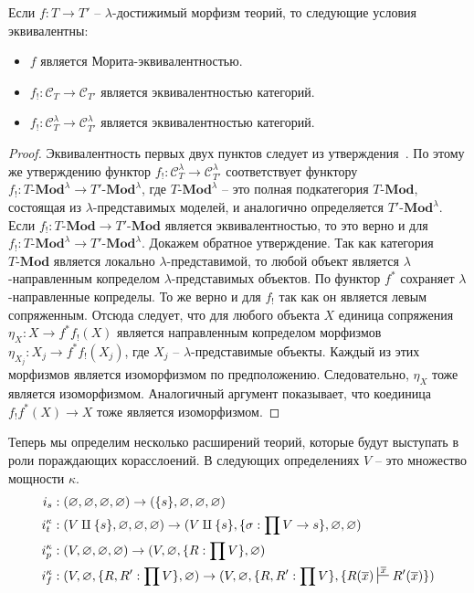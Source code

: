 \documentclass[reqno]{amsart}
\theoremstyle{definition}
\theoremstyle{remark}
\newcommand{\bcat}[1]{\mathbf{#1}}
\newcommand{\cat}[1]{\mathcal{#1}}
\newcommand{\Mod}[1]{#1\text{-}\bcat{Mod}}
\begin{document}
\begin{prop}
Если $f : T \to T'$ -- $\lambda$-достижимый морфизм теорий, то следующие условия эквивалентны:
\begin{itemize}
\item $f$ является Морита-эквивалентностью.
\item $f_! : \cat{C}_T \to \cat{C}_{T'}$ является эквивалентностью категорий.
\item $f_! : \cat{C}_T^\lambda \to \cat{C}_{T'}^\lambda$ является эквивалентностью категорий.
\end{itemize}
\end{prop}
\begin{proof}
Эквивалентность первых двух пунктов следует из утверждения~.
По этому же утверждению функтор $f_! : \cat{C}_T^\lambda \to \cat{C}_{T'}^\lambda$ соответствует функтору $f_! : \Mod{T}^\lambda \to \Mod{T'}^\lambda$,
где $\Mod{T}^\lambda$ -- это полная подкатегория $\Mod{T}$, состоящая из $\lambda$-представимых моделей, и аналогично определяется $\Mod{T'}^\lambda$.
Если $f_! : \Mod{T} \to \Mod{T'}$ является эквивалентностью, то это верно и для $f_! : \Mod{T}^\lambda \to \Mod{T'}^\lambda$.
Докажем обратное утверждение.
Так как категория $\Mod{T}$ является локально $\lambda$-представимой, то любой объект является $\lambda$-направленным копределом $\lambda$-представимых объектов.
По  функтор $f^*$ сохраняет $\lambda$-направленные копределы.
То же верно и для $f_!$ так как он является левым сопряженным.
Отсюда следует, что для любого объекта $X$ единица сопряжения $\eta_X : X \to f^* f_!(X)$
является направленным копределом морфизмов $\eta_{X_j} : X_j \to f^* f_! (X_j)$, где $X_j$ -- $\lambda$-представимые объекты.
Каждый из этих морфизмов является изоморфизмом по предположению.
Следовательно, $\eta_X$ тоже является изоморфизмом.
Аналогичный аргумент показывает, что коединица $f_! f^*(X) \to X$ тоже является изоморфизмом.
\end{proof}

Теперь мы определим несколько расширений теорий, которые будут выступать в роли пораждающих корасслоений.
В следующих определениях $V$ -- это множество мощности $\kappa$.
\begin{align*}
i_s & : (\varnothing,\varnothing,\varnothing,\varnothing) \to (\{ s \},\varnothing,\varnothing,\varnothing) \\
i_t^\kappa & : (V \amalg \{ s \}, \varnothing, \varnothing, \varnothing) \to (V \amalg \{ s \}, \{ \sigma : \prod V \to s \}, \varnothing, \varnothing) \\
i_p^\kappa & : (V, \varnothing, \varnothing, \varnothing) \to (V, \varnothing, \{ R : \prod V \}, \varnothing) \\
i_f^\kappa & : (V, \varnothing, \{ R, R' : \prod V \}, \varnothing) \to (V, \varnothing, \{ R, R' : \prod V \}, \{ R(\overline{x}) \sststile{}{\overline{x}} R'(\overline{x}) \})
\end{align*}
\end{document}
